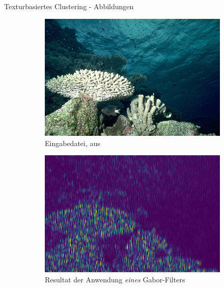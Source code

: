 \documentclass{beamer}
\begin{document}
\begin{frame}{Texturbasiertes Clustering - Abbildungen}
	\begin{figure}
		\begin{subfigure}[t]{.3\textwidth}
			\includegraphics[width=\textwidth,keepaspectratio]{gfx/101027.jpg}
			\caption{Eingabedatei, aus \cite{bsd500}}
		\end{subfigure}
		\hfill
			\begin{subfigure}[t]{.3\textwidth}
			\includegraphics[width=\textwidth,keepaspectratio]{gfx/101027.jpg_0.png}
			\caption{Resultat der Anwendung \emph{eines} Gabor-Filters}
		\end{subfigure}
		\hfill
		\begin{subfigure}[t]{.3\textwidth}

\end{subfigure}
\end{figure}
\end{frame}
\end{document}
